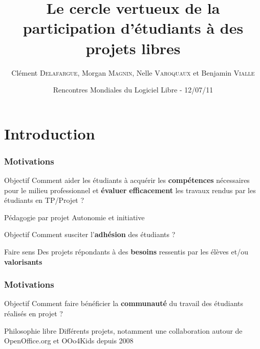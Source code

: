 \documentclass[hyperref,french,usenames,xcolor=dvipsnames]{beamer}
\title[OOo Edu]%
{Le cercle vertueux de la participation d'étudiants à des projets libres}
\author[C. \textsc{Delafargue}, M. \textsc{Magnin}, N. \textsc{Varoquaux}, B. \textsc{Vialle}]%
{Clément \textsc{Delafargue}, Morgan \textsc{Magnin}, Nelle \textsc{Varoquaux} et Benjamin \textsc{Vialle}
}
\institute[ECN]{
\structure{
École Centrale de Nantes}
}
\date[12/07/2011]{Rencontres Mondiales du Logiciel Libre - 12/07/11}
\begin{document}
\frame{\titlepage}


\section{Introduction}

\frame
{
  \frametitle{Motivations}

\begin{alertblock}{Objectif}
Comment aider les étudiants à acquérir les \textbf{compétences} nécessaires pour le milieu professionnel et \textbf{évaluer} \textbf{efficacement} les travaux rendus par les étudiants en TP/Projet ?
\end{alertblock}

\begin{block}{Pédagogie par projet}
Autonomie et initiative
\end{block}

\begin{alertblock}{Objectif}
Comment susciter l'\textbf{adhésion} des étudiants ? 
\end{alertblock}

\begin{block}{Faire sens}
Des projets répondants à des \textbf{besoins} ressentis par les élèves et/ou \textbf{valorisants}
\end{block}
}

\frame
{
  \frametitle{Motivations}

\begin{alertblock}{Objectif}
Comment faire bénéficier la \textbf{communauté} du travail des étudiants réalisés en projet ?
\end{alertblock}

\begin{block}{Philosophie libre}
Différents projets, notamment une collaboration autour de OpenOffice.org et OOo4Kids depuis 2008
\end{block}
}

\end{document}

